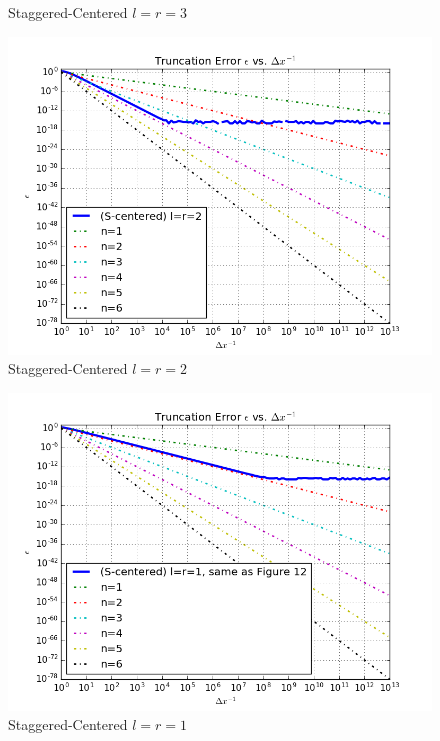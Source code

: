 \documentclass[12pt]{article}
\newenvironment{problem}[2][Problem]{\begin{trivlist}
\item[\hskip \labelsep {\bfseries #1}\hskip \labelsep {\bfseries #2.}]}{\end{trivlist}}
\begin{document}
\begin{problem}{1}
\begin{figure}
 \caption{Staggered-Centered $l = r= 3$}
\label{label}
\end{figure}
\begin{figure}
\centering
  \includegraphics[scale=0.5]{scl2r2}
 \caption{Staggered-Centered $l = r= 2$}
\label{label}
\end{figure}
\begin{figure}
\centering
  \includegraphics[scale=0.5]{scl1r1}
 \caption{Staggered-Centered $l = r= 1$}
\label{label}
\end{figure}
\begin{figure}
\centering

\end{figure}
\end{problem}
\end{document}

